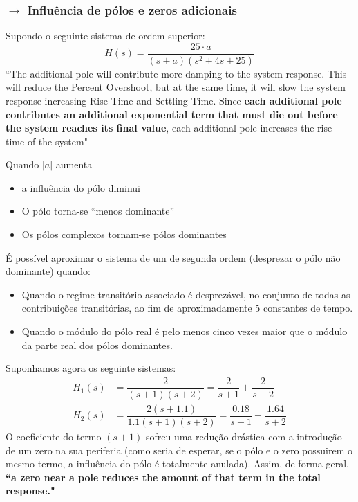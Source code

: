 \newpage
\subsubsection[2.1.3 Influência de pólos e zeros adicionais]{$\pmb{\rightarrow}$ Influência de pólos e zeros adicionais}

\noindent Supondo o seguinte sistema de ordem superior:
$$
    H(s) = \dfrac{25 \cdot a}{(s + a)(s^2 + 4s + 25)}
$$
\noindent  ``The additional pole will contribute more damping to the system response. This will reduce the Percent Overshoot, but at the same time, it will slow the system response increasing Rise Time and Settling Time. Since \textbf{each additional pole contributes an additional exponential term that must die out before the system
reaches its final value}, each additional pole increases the rise time of the system"\cite{FranklinPowell2015} 

\vspace{1 em}
\noindent Quando $|a|$ aumenta
\begin{itemize}
    \item a influência do pólo diminui
    \item O pólo torna-se “menos dominante”
    \item Os pólos complexos tornam-se pólos dominantes
\end{itemize}

\noindent É possível aproximar o sistema de um de segunda ordem (desprezar o pólo não dominante) quando:
\begin{itemize}
    \item Quando o regime transitório associado é desprezável, no conjunto de todas as
contribuições transitórias, ao fim de aproximadamente 5 constantes de tempo.
    \item Quando o módulo do pólo real é pelo menos cinco vezes maior que o módulo
da parte real dos pólos dominantes.
\end{itemize}

\noindent Suponhamos agora os seguinte sistemas:
$$
    \begin{aligned}
        H_1(s) &= \dfrac{2}{(s + 1)(s + 2)} = \dfrac{2}{s + 1} + \dfrac{2}{s + 2}\\[4pt]
        H_2(s) &= \dfrac{2(s + 1.1)}{1.1 (s + 1)(s + 2)} = \dfrac{0.18}{s + 1} + \dfrac{1.64}{s + 2}
    \end{aligned}
$$
\noindent O coeficiente do termo $(s + 1)$ sofreu uma redução drástica com a introdução de um zero na sua periferia (como seria de esperar, se o pólo e o zero possuirem o mesmo termo, a influência do pólo é totalmente anulada). Assim, de forma geral, \textbf{``a zero near a pole reduces the amount of that term in the total response."}\cite{FranklinPowell2015}

